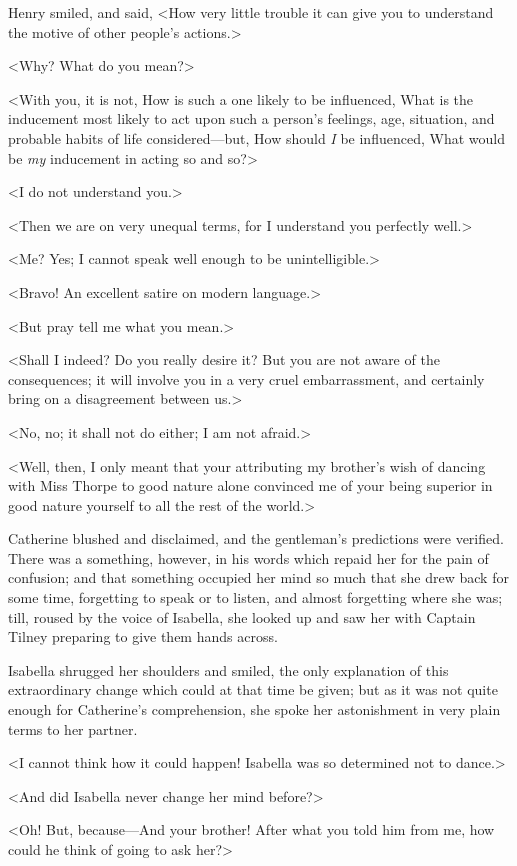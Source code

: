  Henry smiled, and said, <How very little trouble it can give you to understand the motive of other people's actions.> 

 <Why? What do you mean?> 

 <With you, it is not, How is such a one likely to be influenced, What is the inducement most likely to act upon such a person's feelings, age, situation, and probable habits of life considered—but, How should \textit{I} be influenced, What would be \textit{my} inducement in acting so and so?> 

 <I do not understand you.> 

 <Then we are on very unequal terms, for I understand you perfectly well.> 

 <Me? Yes; I cannot speak well enough to be unintelligible.> 

 <Bravo! An excellent satire on modern language.> 

 <But pray tell me what you mean.> 

 <Shall I indeed? Do you really desire it? But you are not aware of the consequences; it will involve you in a very cruel embarrassment, and certainly bring on a disagreement between us.> 

 <No, no; it shall not do either; I am not afraid.> 

 <Well, then, I only meant that your attributing my brother's wish of dancing with Miss Thorpe to good nature alone convinced me of your being superior in good nature yourself to all the rest of the world.> 

 Catherine blushed and disclaimed, and the gentleman's predictions were verified. There was a something, however, in his words which repaid her for the pain of confusion; and that something occupied her mind so much that she drew back for some time, forgetting to speak or to listen, and almost forgetting where she was; till, roused by the voice of Isabella, she looked up and saw her with Captain Tilney preparing to give them hands across. 

 Isabella shrugged her shoulders and smiled, the only explanation of this extraordinary change which could at that time be given; but as it was not quite enough for Catherine's comprehension, she spoke her astonishment in very plain terms to her partner. 

 <I cannot think how it could happen! Isabella was so determined not to dance.> 

 <And did Isabella never change her mind before?> 

 <Oh! But, because—And your brother! After what you told him from me, how could he think of going to ask her?> 

